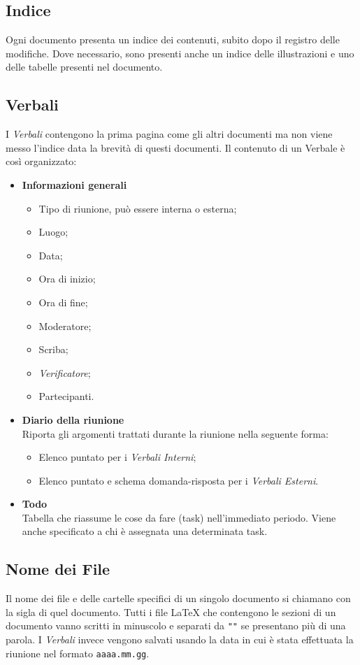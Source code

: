 \subsection{Indice}
Ogni documento presenta un indice dei contenuti, subito dopo il registro delle modifiche. Dove necessario, sono presenti anche un indice delle illustrazioni e uno delle tabelle presenti nel documento.
\subsection{Verbali}
I \textit{Verbali} contengono la prima pagina come gli altri documenti ma non viene messo l'indice data la brevità di questi documenti. Il contenuto di un Verbale è così organizzato:
\begin{itemize}
    \item \textbf{Informazioni generali}
    \begin{itemize}
        \item Tipo di riunione, può essere interna o esterna;
        \item Luogo;
        \item Data;
        \item Ora di inizio;
        \item Ora di fine;
        \item Moderatore;
        \item Scriba;
        \item \textit{Verificatore};
        \item Partecipanti.
    \end{itemize}
    \item \textbf{Diario della riunione}\\
    Riporta gli argomenti trattati durante la riunione nella seguente forma:
    \begin{itemize}
      \item Elenco puntato per i \textit{Verbali Interni};
      \item Elenco puntato e schema domanda-risposta per i \textit{Verbali Esterni}.
    \end{itemize}
    \item \textbf{Todo}\\
    Tabella che riassume le cose da fare (task) nell'immediato periodo. Viene anche specificato a chi è assegnata una determinata task.
\end{itemize}
\subsection{Nome dei File}
Il nome dei file e delle cartelle specifici di un singolo documento si chiamano con la sigla di quel documento. Tutti i file \LaTeX{} che contengono le sezioni di un documento vanno scritti in minuscolo e separati da \texttt{"\textunderscore"} se presentano più di una parola. I \textit{Verbali} invece vengono salvati usando la data in cui è stata effettuata la riunione nel formato \texttt{aaaa.mm.gg}.
